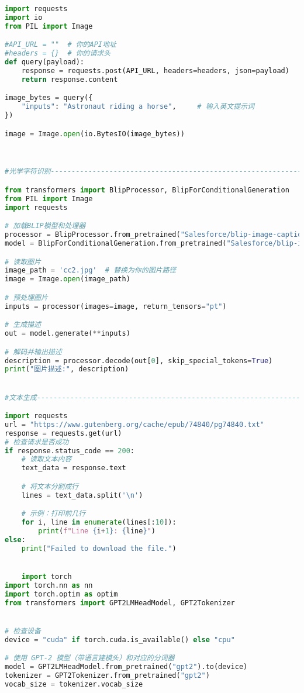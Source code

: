 \documentclass{article}
\begin{document}
\begin{lstlisting}[language=Python]
import requests
import io
from PIL import Image

#API_URL = ""  # 你的API地址
#headers = {}  # 你的请求头
def query(payload):
    response = requests.post(API_URL, headers=headers, json=payload)
    return response.content

image_bytes = query({
    "inputs": "Astronaut riding a horse",     # 输入英文提示词
})

image = Image.open(io.BytesIO(image_bytes))



#光学字符识别-------------------------------------------------------------------------------------

from transformers import BlipProcessor, BlipForConditionalGeneration
from PIL import Image
import requests

# 加载BLIP模型和处理器
processor = BlipProcessor.from_pretrained("Salesforce/blip-image-captioning-base")
model = BlipForConditionalGeneration.from_pretrained("Salesforce/blip-image-captioning-base")

# 读取图片
image_path = 'cc2.jpg'  # 替换为你的图片路径
image = Image.open(image_path)

# 预处理图片
inputs = processor(images=image, return_tensors="pt")

# 生成描述
out = model.generate(**inputs)

# 解码并输出描述
description = processor.decode(out[0], skip_special_tokens=True)
print("图片描述:", description)


#文本生成----------------------------------------------------------------------------

import requests
url = "https://www.gutenberg.org/cache/epub/74840/pg74840.txt"
response = requests.get(url)
# 检查请求是否成功
if response.status_code == 200:
    # 读取文本内容
    text_data = response.text

    # 将文本分割成行
    lines = text_data.split('\n')

    # 示例：打印前几行
    for i, line in enumerate(lines[:10]):
        print(f"Line {i+1}: {line}")
else:
    print("Failed to download the file.")


    import torch
import torch.nn as nn
import torch.optim as optim
from transformers import GPT2LMHeadModel, GPT2Tokenizer


# 检查设备
device = "cuda" if torch.cuda.is_available() else "cpu"

# 使用 GPT-2 模型（带语言建模头）和对应的分词器
model = GPT2LMHeadModel.from_pretrained("gpt2").to(device)
tokenizer = GPT2Tokenizer.from_pretrained("gpt2")
vocab_size = tokenizer.vocab_size


\end{lstlisting}
\end{document}
